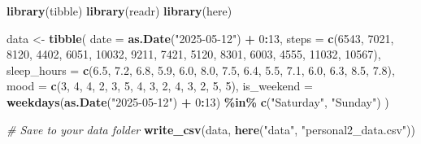 \documentclass[
]{article}
\newenvironment{Shaded}{\begin{snugshade}}{\end{snugshade}}
\newcommand{\AttributeTok}[1]{\textcolor[rgb]{0.13,0.29,0.53}{#1}}
\newcommand{\CommentTok}[1]{\textcolor[rgb]{0.56,0.35,0.01}{\textit{#1}}}
\newcommand{\DecValTok}[1]{\textcolor[rgb]{0.00,0.00,0.81}{#1}}
\newcommand{\FloatTok}[1]{\textcolor[rgb]{0.00,0.00,0.81}{#1}}
\newcommand{\FunctionTok}[1]{\textcolor[rgb]{0.13,0.29,0.53}{\textbf{#1}}}
\newcommand{\NormalTok}[1]{#1}
\newcommand{\OtherTok}[1]{\textcolor[rgb]{0.56,0.35,0.01}{#1}}
\newcommand{\SpecialCharTok}[1]{\textcolor[rgb]{0.81,0.36,0.00}{\textbf{#1}}}
\newcommand{\StringTok}[1]{\textcolor[rgb]{0.31,0.60,0.02}{#1}}
\begin{document}
\begin{Shaded}
\begin{Highlighting}[]
\FunctionTok{library}\NormalTok{(tibble)}
\FunctionTok{library}\NormalTok{(readr)}
\FunctionTok{library}\NormalTok{(here)}

\NormalTok{data }\OtherTok{\textless{}{-}} \FunctionTok{tibble}\NormalTok{(}
  \AttributeTok{date =} \FunctionTok{as.Date}\NormalTok{(}\StringTok{"2025{-}05{-}12"}\NormalTok{) }\SpecialCharTok{+} \DecValTok{0}\SpecialCharTok{:}\DecValTok{13}\NormalTok{,}
  \AttributeTok{steps =} \FunctionTok{c}\NormalTok{(}\DecValTok{6543}\NormalTok{, }\DecValTok{7021}\NormalTok{, }\DecValTok{8120}\NormalTok{, }\DecValTok{4402}\NormalTok{, }\DecValTok{6051}\NormalTok{, }\DecValTok{10032}\NormalTok{, }\DecValTok{9211}\NormalTok{,}
            \DecValTok{7421}\NormalTok{, }\DecValTok{5120}\NormalTok{, }\DecValTok{8301}\NormalTok{, }\DecValTok{6003}\NormalTok{, }\DecValTok{4555}\NormalTok{, }\DecValTok{11032}\NormalTok{, }\DecValTok{10567}\NormalTok{),}
  \AttributeTok{sleep\_hours =} \FunctionTok{c}\NormalTok{(}\FloatTok{6.5}\NormalTok{, }\FloatTok{7.2}\NormalTok{, }\FloatTok{6.8}\NormalTok{, }\FloatTok{5.9}\NormalTok{, }\FloatTok{6.0}\NormalTok{, }\FloatTok{8.0}\NormalTok{, }\FloatTok{7.5}\NormalTok{,}
                  \FloatTok{6.4}\NormalTok{, }\FloatTok{5.5}\NormalTok{, }\FloatTok{7.1}\NormalTok{, }\FloatTok{6.0}\NormalTok{, }\FloatTok{6.3}\NormalTok{, }\FloatTok{8.5}\NormalTok{, }\FloatTok{7.8}\NormalTok{),}
  \AttributeTok{mood =} \FunctionTok{c}\NormalTok{(}\DecValTok{3}\NormalTok{, }\DecValTok{4}\NormalTok{, }\DecValTok{4}\NormalTok{, }\DecValTok{2}\NormalTok{, }\DecValTok{3}\NormalTok{, }\DecValTok{5}\NormalTok{, }\DecValTok{4}\NormalTok{, }\DecValTok{3}\NormalTok{, }\DecValTok{2}\NormalTok{, }\DecValTok{4}\NormalTok{, }\DecValTok{3}\NormalTok{, }\DecValTok{2}\NormalTok{, }\DecValTok{5}\NormalTok{, }\DecValTok{5}\NormalTok{),}
  \AttributeTok{is\_weekend =} \FunctionTok{weekdays}\NormalTok{(}\FunctionTok{as.Date}\NormalTok{(}\StringTok{"2025{-}05{-}12"}\NormalTok{) }\SpecialCharTok{+} \DecValTok{0}\SpecialCharTok{:}\DecValTok{13}\NormalTok{) }\SpecialCharTok{\%in\%} \FunctionTok{c}\NormalTok{(}\StringTok{"Saturday"}\NormalTok{, }\StringTok{"Sunday"}\NormalTok{)}
\NormalTok{)}

\CommentTok{\# Save to your data folder}
\FunctionTok{write\_csv}\NormalTok{(data, }\FunctionTok{here}\NormalTok{(}\StringTok{"data"}\NormalTok{, }\StringTok{"personal2\_data.csv"}\NormalTok{))}
\end{Highlighting}
\end{Shaded}
\end{document}
